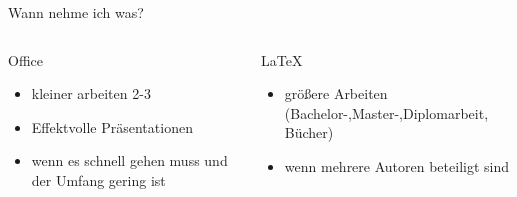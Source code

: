 \begin{frame}{Wann nehme ich was?}
	\begin{columns}
	\centering
		\begin{column}{0.45\textwidth}
			Office
			\begin{itemize}[<+->]
			\item kleiner arbeiten 2-3
			\item Effektvolle Präsentationen
			\item wenn es schnell gehen muss und der Umfang gering ist
			\end{itemize}
		\end{column}
		\begin{column}{0.45\textwidth}
			\LaTeX
			\begin{itemize}[<+->]
			\item größere Arbeiten (Bachelor-,Master-,Diplomarbeit, Bücher)
			\item wenn mehrere Autoren beteiligt sind
			\end{itemize}
		\end{column}
	\end{columns}
\end{frame}